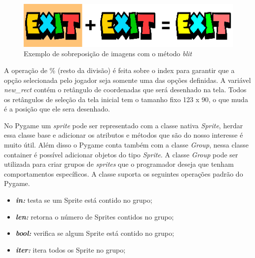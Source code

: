 \begin{figure}[h!]
    \centering
    \includegraphics[width=1\linewidth]{figuras/blit_example.png}
    \caption{Exemplo de sobreposição de imagens com o método \textit{blit}}
    \label{fig:blit-example}
\end{figure}

A operação de \% (resto da divisão) é feita sobre o index para garantir que a opção selecionada pelo jogador seja somente uma das opções definidas. A variável \textit{new\_rect} contém o retângulo de coordenadas que será desenhado na tela. Todos os retângulos de seleção da tela inicial tem o tamanho fixo 123 x 90, o que muda é a posição que ele sera desenhado.

No Pygame um \textit{sprite} pode ser representado com a classe nativa \textit{Sprite}, herdar essa classe base e adicionar os atributos e métodos que são do nosso interesse é muito útil. Além disso o Pygame conta também com a classe \textit{Group}, nessa classe container é possível adicionar objetos do tipo \textit{Sprite}. A classe \textit{Group} pode ser utilizada para criar grupos de \textit{sprites} que o programador deseja que tenham comportamentos específicos. A classe suporta os seguintes operações padrão do Pygame.
\begin{itemize}
    \item \textbf{\textit{in:}}  testa se um Sprite está contido no grupo;
    \item \textbf{\textit{len:}}  retorna o número de Sprites contidos no grupo;
    \item \textbf{\textit{bool:}}  verifica se algum Sprite está contido no grupo;
    \item \textbf{\textit{iter:}}  itera todos os Sprite no grupo;
\end{itemize}



